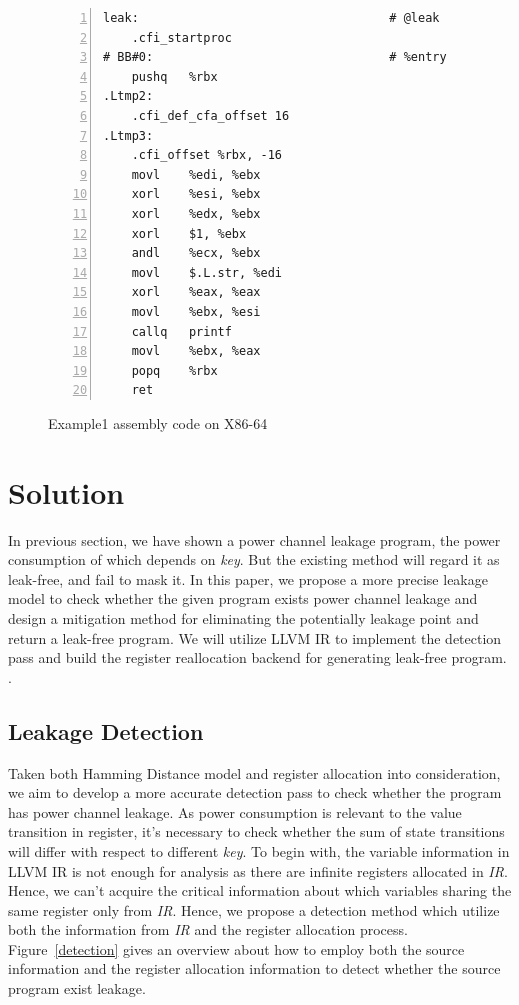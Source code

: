 \documentclass[10pt, conference]{IEEEtran}
\begin{document}
\begin{figure}[hbt!]
\centering
\begin{minipage}{.65\linewidth}
\begin{lstlisting}[language={[ANSI]C},numbers=left,numberstyle=\tiny, basicstyle=\ttfamily\small, frame=none]
leak:                                   # @leak
	.cfi_startproc
# BB#0:                                 # %entry
	pushq	%rbx
.Ltmp2:
	.cfi_def_cfa_offset 16
.Ltmp3:
	.cfi_offset %rbx, -16
	movl	%edi, %ebx
	xorl	%esi, %ebx
	xorl	%edx, %ebx
	xorl	$1, %ebx
	andl	%ecx, %ebx
	movl	$.L.str, %edi
	xorl	%eax, %eax
	movl	%ebx, %esi
	callq	printf
	movl	%ebx, %eax
	popq	%rbx
	ret
\end{lstlisting}
\end{minipage}
\caption{Example1 assembly code on X86-64}
\label{example2}
\end{figure}

\section{Solution}
In previous section, we have shown a power channel leakage program, the power consumption of which depends on \emph{key}. But the existing method\cite{eldib2014synthesis} will regard it as leak-free, and fail to mask it. In this paper, we propose a more precise leakage model to check whether the given program exists power channel leakage and design a mitigation method for eliminating the potentially leakage point and return a leak-free program. We will utilize LLVM IR to implement the detection pass and build the register reallocation backend for generating leak-free program. .
\subsection{Leakage Detection}
Taken both Hamming Distance model and register allocation into consideration, we aim to develop a more accurate detection pass to check whether the program has power channel leakage. As power consumption is relevant to the value transition in register, it's necessary to check whether the sum of state transitions will differ with respect to different \emph{key}. To begin with, the variable information in LLVM IR is not enough for analysis as there are infinite registers allocated in \emph{IR}. Hence, we can't acquire the critical information about which variables sharing the same register only from \emph{IR}. Hence, we propose a detection method which utilize both the information from \emph{IR} and the register allocation process. Figure~\ref{detection} gives an overview about how to employ both the source information and the register allocation information to detect whether the source program exist leakage. 
\end{document}
